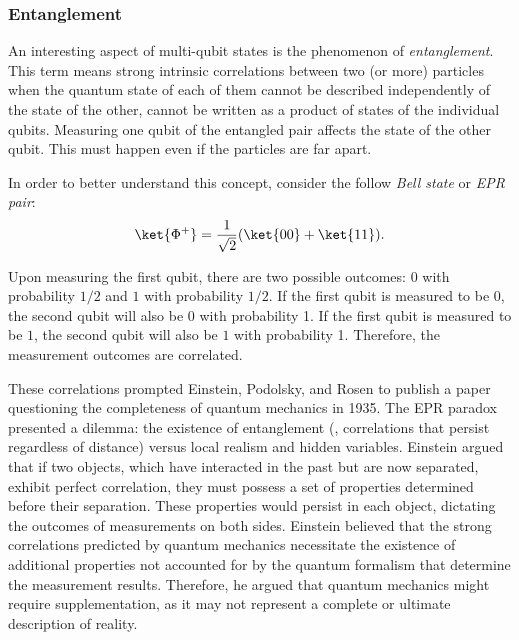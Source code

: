 
\subsubsection{Entanglement}

\begin{definition}
  An interesting aspect of multi-qubit states is the phenomenon of \emph{entanglement}. This term means strong intrinsic correlations between two (or more) particles when the quantum state of each of them cannot be described independently of the state of the other,  cannot be written as a product of states of the individual qubits. Measuring one qubit of the entangled pair affects the state of the other qubit. This must happen even if the particles are far apart.
\end{definition}

In order to better understand this concept, consider the follow \emph{Bell state} or \emph{EPR pair}:
\begin{equation*}
  \ket{\Phi^{+}} = \frac{1}{\sqrt{2}}(\ket{00} + \ket{11}).
\end{equation*}

Upon measuring the first qubit, there are two possible outcomes: $0$ with probability $1/2$ and $1$ with probability $1/2$. If the first qubit is measured to be $0$, the second qubit will also be $0$ with probability 1. If the first qubit is measured to be $1$, the second qubit will also be $1$ with probability 1. Therefore, the measurement outcomes are correlated.

These correlations prompted Einstein, Podolsky, and Rosen to publish a paper \cite{einstein1935can} questioning the completeness of quantum mechanics in 1935. The EPR paradox presented a dilemma: the existence of entanglement (, correlations that persist regardless of distance) versus local realism and hidden variables. Einstein argued that if two objects, which have interacted in the past but are now separated, exhibit perfect correlation, they must possess a set of properties determined before their separation. These properties would persist in each object, dictating the outcomes of measurements on both sides. Einstein believed that the strong correlations predicted by quantum mechanics necessitate the existence of additional properties not accounted for by the quantum formalism that determine the measurement results. Therefore, he argued that quantum mechanics might require supplementation, as it may not represent a complete or ultimate description of reality.


